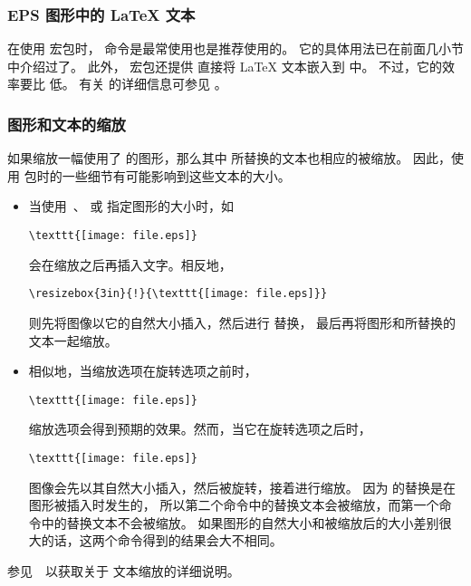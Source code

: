 \subsubsection{EPS 图形中的 \LaTeX{} 文本}\label{sssec:latextext}

在使用  宏包时， 命令是最常使用也是推荐使用的。
它的具体用法已在前面几小节中介绍过了。
此外， 宏包还提供  直接将 \LaTeX{} 文本嵌入到  中。
不过，它的效率要比  低。
有关  的详细信息可参见 \cite{psfrag-doc}。

\subsubsection{图形和文本的缩放}\label{sssec:psfragscale}

如果缩放一幅使用了  的图形，那么其中  所替换的文本也相应的被缩放。
因此，使用  包时的一些细节有可能影响到这些文本的大小。

\begin{itemize}
\item 当使用~、 或  指定图形的大小时，如
\begin{lstlisting}
\texttt{[image: file.eps]}
\end{lstlisting}
       会在缩放之后再插入文字。相反地，
\begin{lstlisting}
\resizebox{3in}{!}{\texttt{[image: file.eps]}}
\end{lstlisting}
      则先将图像以它的自然大小插入，然后进行 替换，
      最后再将图形和所替换的文本一起缩放。
      
\item 相似地，当缩放选项在旋转选项之前时，
\begin{lstlisting}
\texttt{[image: file.eps]}
\end{lstlisting}
      缩放选项会得到预期的效果。然而，当它在旋转选项之后时，
\begin{lstlisting}
\texttt{[image: file.eps]}
\end{lstlisting}
      图像会先以其自然大小插入，然后被旋转，接着进行缩放。
      因为  的替换是在图形被插入时发生的，
      所以第二个命令中的替换文本会被缩放，而第一个命令中的替换文本不会被缩放。
      如果图形的自然大小和被缩放后的大小差别很大的话，这两个命令得到的结果会大不相同。
\end{itemize}
参见~\cite{psfrag-doc}~以获取关于  文本缩放的详细说明。

